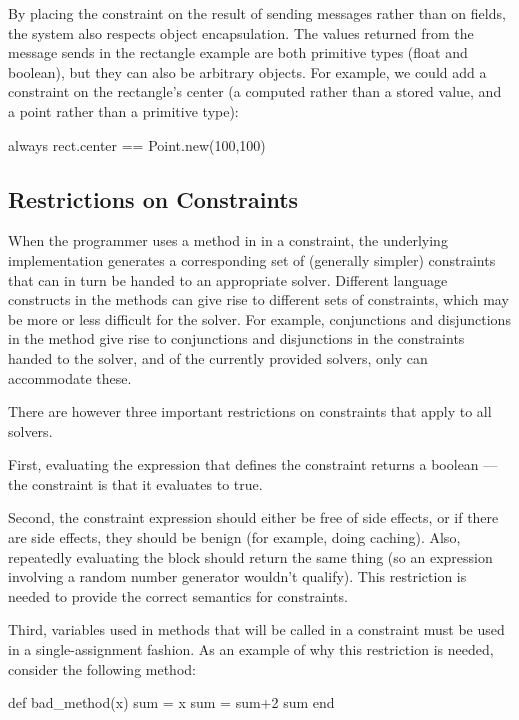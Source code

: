By placing the constraint on the result of sending messages rather
than on fields, the system also respects object encapsulation.  The
values returned from the message sends in the rectangle example are
both primitive types (float and boolean), but they can also be
arbitrary objects.  For example, we could add a constraint on the
rectangle's center (a computed rather than a stored value, and a point
rather than a primitive type):

\begin{code}
always { rect.center == Point.new(100,100) }
\end{code}

\subsection{Restrictions on Constraints}
\label{sec:constraint-restrictions}

When the programmer uses a method in \langname in a constraint, the
underlying implementation generates a corresponding set of (generally
simpler) constraints that can in turn be handed to an appropriate
solver.  Different language constructs in the methods can give rise to
different sets of constraints, which may be more or less difficult for
the solver.  For example, conjunctions and disjunctions in the method
give rise to conjunctions and disjunctions in the constraints handed
to the solver, and of the currently provided solvers, only \zthree
can accommodate these.

There are however three important restrictions on constraints that
apply to all solvers.

First, evaluating the expression that defines the constraint returns a
boolean --- the constraint is that it evaluates to true.

Second, the constraint expression should either be free of side
effects, or if there are side effects, they should be benign (for
example, doing caching).  Also, repeatedly evaluating the block should
return the same thing (so an expression involving a random number
generator wouldn't qualify).  This restriction is needed to provide
the correct semantics for constraints.

Third, variables used in methods that will be called in a constraint
must be used in a single-assignment fashion.  As an example of why
this restriction is needed, consider the following method:
\begin{code}
def bad_method(x)
  sum = x
  sum = sum+2
  sum
end
\end{code}

